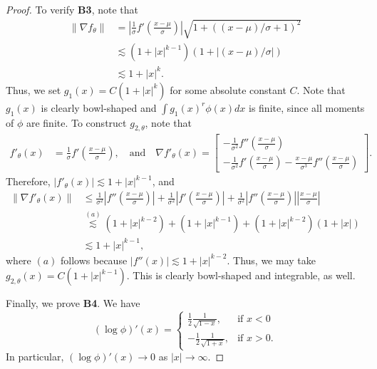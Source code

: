 \documentclass{article}
\begin{document}
\begin{proof}
To verify \textbf{B3}, note that
\begin{align*}
\| \nabla f_\theta \| & = \left| \frac{1}{\sigma} f'\left( \frac{x - \mu}{\sigma} \right) \right| 
            \sqrt{ 1 + ((x-\mu)/\sigma + 1)^2 } \\
     & \lesssim (1 + |x|^{k-1}) (1 + |(x-\mu)/\sigma| ) \\
     & \lesssim 1 + |x|^k.
\end{align*}
Thus, we set $g_1(x) = C(1 + |x|^k) $ for some absolute constant $C$. Note that $g_1(x)$ is clearly bowl-shaped and $\int g_1(x)^r \phi(x) dx$ is finite, since all moments of $\phi$ are finite.
To construct $g_{2, \theta}$, note that
\begin{align*}
f'_\theta(x) &= \frac{1}{\sigma} f'\left( \frac{x - \mu}{\sigma} \right), \quad \text{and} \quad
\nabla f'_\theta(x) = 
           \left[   \begin{array}{c}
                  -\frac{1}{\sigma^2} f''\left( \frac{x -\mu}{\sigma} \right) \\
            - \frac{1}{\sigma^2} f'\left( \frac{x - \mu}{\sigma} \right) 
        -  \frac{x - \mu}{\sigma^3} f''\left( \frac{x -\mu}{\sigma} \right)  \end{array} \right].
\end{align*}
Therefore, $|f'_\theta(x)| \lesssim 1 + |x|^{k-1}$, and
\begin{align*}
\| \nabla f'_\theta(x) \| &\leq \frac{1}{\sigma^2} \left| f''\left( \frac{x - \mu}{\sigma} \right) \right| + 
                            \frac{1}{\sigma^2} \left| f'\left( \frac{x - \mu}{\sigma} \right) \right| +
                           \frac{1}{\sigma^2} \left| f''\left( \frac{x - \mu}{\sigma} \right) \right| 
     \left| \frac{x - \mu}{\sigma} \right| \\
                     & \stackrel{(a)} \lesssim (1 + |x|^{k-2}) + (1 + |x|^{k-1}) + (1 + |x|^{k-2}) (1 + |x|) \\
                    &  \lesssim 1 + |x|^{k-1},
\end{align*}
where $(a)$ follows because $|f''(x)| \lesssim 1 + |x|^{k-2}$. Thus, we may take $g_{2,\theta}(x) = C( 1 + |x|^{k-1})$. This is clearly bowl-shaped and integrable, as well.

Finally, we prove \textbf{B4}. We have
\begin{equation*}
(\log \phi)'(x) = \begin{cases}
\frac{1}{2} \frac{1}{\sqrt{1 - x }}, & \text{if } x < 0 \\
- \frac{1}{2} \frac{1}{\sqrt{1 + x}}, & \text{if } x > 0.
\end{cases}
\end{equation*}
In particular, $(\log \phi)'(x) \rightarrow 0$ as $|x| \rightarrow \infty$.


\end{proof}
\end{document}
